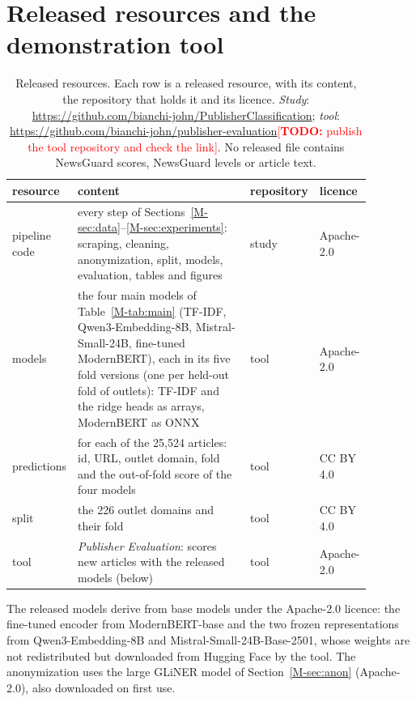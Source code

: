 \documentclass[11pt,a4paper]{article}
\newcommand{\todo}[1]{\textcolor{red}{[\textbf{TODO:} #1]}}
\begin{document}
\section{Released resources and the demonstration tool}\label{app:tool}
\begin{table}[t]
\centering\small
\caption{Released resources. Each row is a released resource, with its content, the repository that holds it and its
licence. \emph{Study}: \url{https://github.com/bianchi-john/PublisherClassification}; \emph{tool}:
\url{https://github.com/bianchi-john/publisher-evaluation}\todo{publish the tool repository and check the
link}. No released file contains NewsGuard scores, NewsGuard levels or article text.}\label{tab:release}
\begin{tabular}{p{0.15\linewidth}p{0.50\linewidth}p{0.11\linewidth}p{0.12\linewidth}}
\toprule
resource & content & repository & licence \\
\midrule
pipeline code & every step of Sections~\ref{M-sec:data}--\ref{M-sec:experiments}: scraping, cleaning, anonymization,
  split, models, evaluation, tables and figures & study & Apache-2.0 \\
models & the four main models of Table~\ref{M-tab:main} (TF-IDF, Qwen3-Embedding-8B, Mistral-Small-24B,
  fine-tuned ModernBERT), each in its five fold versions (one per held-out fold of outlets):
  TF-IDF and the ridge heads as arrays, ModernBERT as ONNX & tool & Apache-2.0 \\
predictions & for each of the 25,524 articles: id, URL, outlet domain, fold and the out-of-fold score of the four
  models & tool & CC BY 4.0 \\
split & the 226 outlet domains and their fold & tool & CC BY 4.0 \\
tool & \emph{Publisher Evaluation}: scores new articles with the released models (below) & tool & Apache-2.0 \\
\bottomrule
\end{tabular}
\end{table}

The released models derive from base models under the Apache-2.0 licence: the fine-tuned encoder from ModernBERT-base
and the two frozen representations from Qwen3-Embedding-8B and Mistral-Small-24B-Base-2501, whose weights are not
redistributed but downloaded from Hugging Face by the tool. The anonymization uses the large GLiNER model of
Section~\ref{M-sec:anon} (Apache-2.0), also downloaded on first use.
\end{document}

